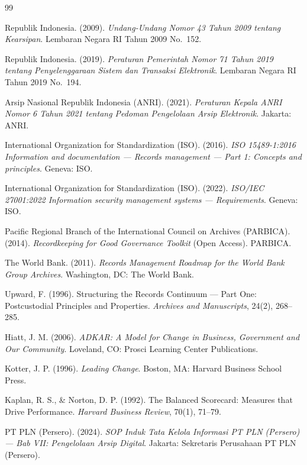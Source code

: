 \documentclass[12pt,a4paper]{report}
\begin{document}
\begin{thebibliography}{99}
\small

 Republik Indonesia. (2009). \textit{Undang-Undang Nomor 43 Tahun 2009 tentang Kearsipan}. Lembaran Negara RI Tahun 2009 No.~152.

 Republik Indonesia. (2019). \textit{Peraturan Pemerintah Nomor 71 Tahun 2019 tentang Penyelenggaraan Sistem dan Transaksi Elektronik}. Lembaran Negara RI Tahun 2019 No.~194.

 Arsip Nasional Republik Indonesia (ANRI). (2021). \textit{Peraturan Kepala ANRI Nomor 6 Tahun 2021 tentang Pedoman Pengelolaan Arsip Elektronik}. Jakarta: ANRI.

 International Organization for Standardization (ISO). (2016). \textit{ISO 15489-1:2016 Information and documentation --- Records management --- Part 1: Concepts and principles}. Geneva: ISO.

 International Organization for Standardization (ISO). (2022). \textit{ISO/IEC 27001:2022 Information security management systems --- Requirements}. Geneva: ISO.

 Pacific Regional Branch of the International Council on Archives (PARBICA). (2014). \textit{Recordkeeping for Good Governance Toolkit} (Open Access). PARBICA.

 The World Bank. (2011). \textit{Records Management Roadmap for the World Bank Group Archives}. Washington, DC: The World Bank.

 Upward, F. (1996). Structuring the Records Continuum --- Part One: Postcustodial Principles and Properties. \textit{Archives and Manuscripts}, 24(2), 268--285.

 Hiatt, J. M. (2006). \textit{ADKAR: A Model for Change in Business, Government and Our Community}. Loveland, CO: Prosci Learning Center Publications.

 Kotter, J. P. (1996). \textit{Leading Change}. Boston, MA: Harvard Business School Press.

 Kaplan, R. S., \& Norton, D. P. (1992). The Balanced Scorecard: Measures that Drive Performance. \textit{Harvard Business Review}, 70(1), 71--79.

 PT PLN (Persero). (2024). \textit{SOP Induk Tata Kelola Informasi PT PLN (Persero) --- Bab VII: Pengelolaan Arsip Digital}. Jakarta: Sekretaris Perusahaan PT PLN (Persero).

\end{thebibliography}
\end{document}
